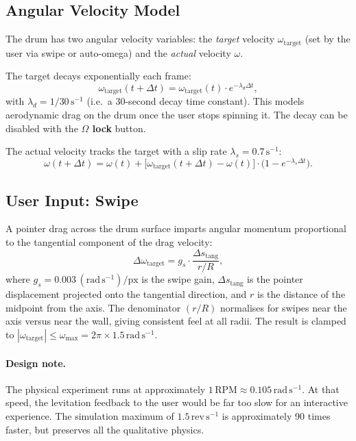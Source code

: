 \documentclass[12pt, a4paper]{article}
\newcommand{\omg}{\omega}
\begin{document}
\subsection{Angular Velocity Model}

The drum has two angular velocity variables: the \emph{target} velocity
$\omg_{\mathrm{target}}$ (set by the user via swipe or auto-omega) and the
\emph{actual} velocity $\omg$.

The target decays exponentially each frame:
\begin{equation}
  \omg_{\mathrm{target}}(t + \Delta t) = \omg_{\mathrm{target}}(t)
    \cdot e^{-\lambda_d \Delta t},
\end{equation}
with $\lambda_d = 1/30\,\mathrm{s}^{-1}$ (i.e.\ a 30-second decay time
constant). This models aerodynamic drag on the drum once the user stops
spinning it. The decay can be disabled with the \textbf{$\Omega$ lock} button.

The actual velocity tracks the target with a slip rate
$\lambda_s = 0.7\,\mathrm{s}^{-1}$:
\begin{equation}
  \omg(t + \Delta t) = \omg(t) + \bigl[\omg_{\mathrm{target}}(t+\Delta t)
    - \omg(t)\bigr] \cdot \bigl(1 - e^{-\lambda_s \Delta t}\bigr).
\end{equation}

\subsection{User Input: Swipe}

A pointer drag across the drum surface imparts angular momentum proportional
to the tangential component of the drag velocity:
\begin{equation}
  \Delta\omg_{\mathrm{target}} = g_s \cdot
    \frac{\Delta s_{\mathrm{tang}}}{r / R},
\end{equation}
where $g_s = 0.003\,\mathrm{(rad\,s^{-1})/px}$ is the swipe gain,
$\Delta s_{\mathrm{tang}}$ is the pointer displacement projected onto the
tangential direction, and $r$ is the distance of the midpoint from the axis.
The denominator $(r/R)$ normalises for swipes near the axis versus near the
wall, giving consistent feel at all radii. The result is clamped to
$|\omg_{\mathrm{target}}| \leq \omg_{\max} = 2\pi \times 1.5\,\mathrm{rad\,s^{-1}}$.

\paragraph{Design note.} The physical experiment runs at approximately
$1\,\mathrm{RPM} \approx 0.105\,\mathrm{rad\,s^{-1}}$. At that speed,
the levitation feedback to the user would be far too slow for an interactive
experience. The simulation maximum of $1.5\,\mathrm{rev\,s^{-1}}$ is
approximately 90 times faster, but preserves all the qualitative physics.
\end{document}
